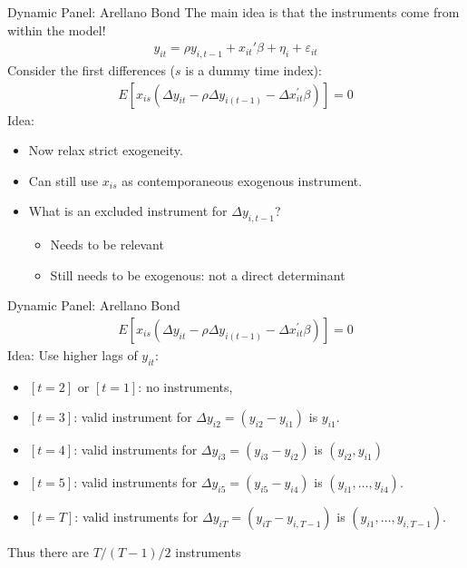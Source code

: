\documentclass[aspectratio=169]{beamer}
\begin{document}
\begin{frame}{Dynamic Panel: Arellano Bond}
The main idea is that the \alert{instruments come from within the model}!
\begin{eqnarray*}
y_{it} = \rho y_{i,t-1} + x_{it}'\beta + \eta_i + \varepsilon_{it}
\end{eqnarray*}
Consider the first differences ($s$ is a dummy time index):
\begin{eqnarray*}
E\left[x_{i s}\left(\Delta y_{i t}-\rho \Delta y_{i(t-1)}-\Delta x_{i t}^{\prime} \beta\right)\right]=0
\end{eqnarray*}
Idea:
\begin{itemize}
\item Now relax \alert{strict exogeneity}.
\item Can still use $x_{is}$ as contemporaneous exogenous instrument.
\item What is an excluded instrument for $\Delta y_{i,t-1}$?
\begin{itemize}
\item Needs to be \alert{relevant}
\item Still needs to be \alert{exogenous}: not a direct determinant
\end{itemize}
\end{itemize}
\end{frame}

\begin{frame}{Dynamic Panel: Arellano Bond}
\begin{eqnarray*}
E\left[x_{i s}\left(\Delta y_{i t}-\rho \Delta y_{i(t-1)}-\Delta x_{i t}^{\prime} \beta\right)\right]=0
\end{eqnarray*}
Idea: Use higher lags of $y_{it}$:
\begin{itemize}
\item $[t=2]$ or $[t=1]$: no instruments,
\item $[t=3]$:  valid instrument for $\Delta y_{i2} = (y_{i2}-y_{i1})$ is $y_{i1}$.
\item $[t=4]$:  valid instruments for $\Delta y_{i3} = (y_{i3}-y_{i2})$ is $(y_{i2}, y_{i1})$
\item$[t=5]$:  valid instruments for $\Delta y_{i5} = (y_{i5}-y_{i4})$ is $(y_{i1},\ldots, y_{i4})$.
\item$[t=T]$:  valid instruments for $\Delta y_{iT} = (y_{iT}-y_{i,T-1})$ is $(y_{i1},\ldots, y_{i,T-1})$.
\end{itemize}
Thus there are $T/(T-1)/2$ instruments
\end{frame}
\end{document}
